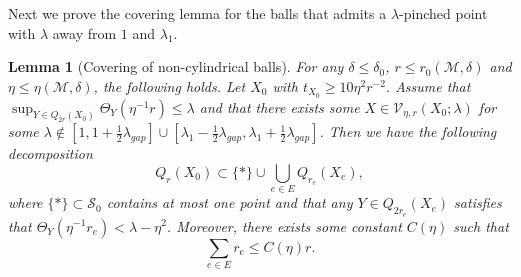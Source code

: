\documentclass[11pt,reqno]{amsart}
\numberwithin{equation}{section}
\newcommand{\cM}{\mathcal{M}}
\newcommand{\cS}{\mathcal{S}}
\newcommand{\cV}{\mathcal{V}}
\newtheorem{lemma}[equation]{Lemma}
\theoremstyle{definition}
\theoremstyle{remark}
\theoremstyle{remark}
\theoremstyle{remark}
\theoremstyle{remark}\newtheorem{conjecture}[equation]{Conjecture}
\theoremstyle{remark}\newtheorem{question}[equation]{Question}
\begin{document}
Next we prove the covering lemma for the balls that admits a $\lambda$-pinched point with $\lambda$ away from $1$ and $\lambda_1$.

\begin{lemma}[Covering of non-cylindrical balls]\label{l:d cover}
 For any $\delta\le \delta_0$, $r \le r_0(\cM,\delta)$ and $\eta \le \eta(\cM,\delta)$, the following holds. Let $X_0$ with $t_{X_0}\ge 10\eta^2 r^{-2}$. Assume that $\sup_{Y\in Q_{2r}(X_0)}\Theta_Y(\eta^{-1}r) \le \lambda$ and that there exists some $X \in \cV_{\eta,r}(X_0;\lambda)$ for some $\lambda \notin  [1,1+ \frac{1}{2}\lambda_{gap}]\cup[\lambda_1 -\frac{1}{2}\lambda_{gap}, \lambda_1 + \frac{1}{2}\lambda_{gap}]$. Then we have the following decomposition
    \begin{equation*}
        Q_r(X_0) \subset \{*\}  \cup \bigcup_{e \in E} Q_{r_e}(X_e),
    \end{equation*}
    where $\{*\}\subset \cS_0$ contains at most one point and that any $Y \in Q_{2r_e}(X_e)$ satisfies that $\Theta_Y(\eta^{-1}r_e) < \lambda - \eta^2$. Moreover, there exists some constant $C(\eta)$ such that
    \begin{equation*}
        \sum_{e\in E} r_e  \le C(\eta) r.
    \end{equation*}
\end{lemma}
\end{document}
